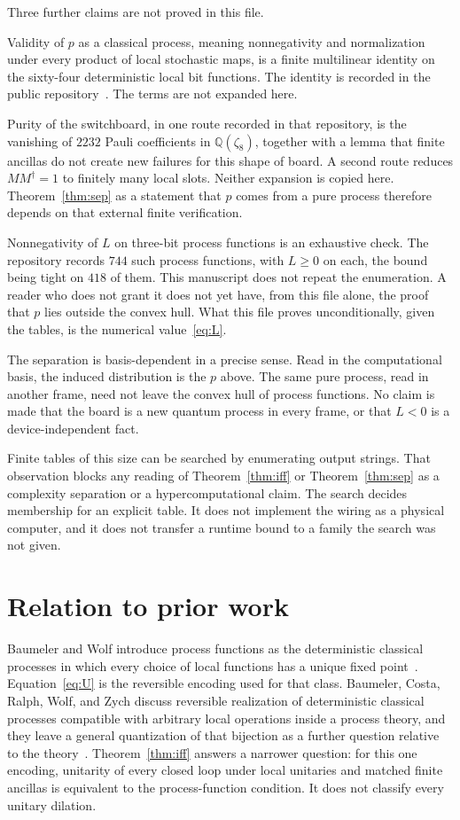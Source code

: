 \documentclass[aps,pra,reprint,amsmath,amssymb,nofootinbib]{revtex4-2}
\begin{document}
Three further claims are not proved in this file.

Validity of \(p\) as a classical process, meaning nonnegativity and normalization under every product of local stochastic maps, is a finite multilinear identity on the sixty-four deterministic local bit functions. The identity is recorded in the public repository~\cite{archive}. The terms are not expanded here.

Purity of the switchboard, in one route recorded in that repository, is the vanishing of \(2232\) Pauli coefficients in \(\mathbb{Q}(\zeta_8)\), together with a lemma that finite ancillas do not create new failures for this shape of board. A second route reduces \(MM^{\dagger}=1\) to finitely many local slots. Neither expansion is copied here. Theorem~\ref{thm:sep} as a statement that \(p\) comes from a pure process therefore depends on that external finite verification.

Nonnegativity of \(L\) on three-bit process functions is an exhaustive check. The repository records \(744\) such process functions, with \(L\ge 0\) on each, the bound being tight on \(418\) of them. This manuscript does not repeat the enumeration. A reader who does not grant it does not yet have, from this file alone, the proof that \(p\) lies outside the convex hull. What this file proves unconditionally, given the tables, is the numerical value~\eqref{eq:L}.

The separation is basis-dependent in a precise sense. Read in the computational basis, the induced distribution is the \(p\) above. The same pure process, read in another frame, need not leave the convex hull of process functions. No claim is made that the board is a new quantum process in every frame, or that \(L<0\) is a device-independent fact.

Finite tables of this size can be searched by enumerating output strings. That observation blocks any reading of Theorem~\ref{thm:iff} or Theorem~\ref{thm:sep} as a complexity separation or a hypercomputational claim. The search decides membership for an explicit table. It does not implement the wiring as a physical computer, and it does not transfer a runtime bound to a family the search was not given.

\section{Relation to prior work}
\label{sec:prior}
Baumeler and Wolf introduce process functions as the deterministic classical processes in which every choice of local functions has a unique fixed point~\cite{baumeler2016}. Equation~\eqref{eq:U} is the reversible encoding used for that class. Baumeler, Costa, Ralph, Wolf, and Zych discuss reversible realization of deterministic classical processes compatible with arbitrary local operations inside a process theory, and they leave a general quantization of that bijection as a further question relative to the theory~\cite{baumeler2019}. Theorem~\ref{thm:iff} answers a narrower question: for this one encoding, unitarity of every closed loop under local unitaries and matched finite ancillas is equivalent to the process-function condition. It does not classify every unitary dilation.
\end{document}
